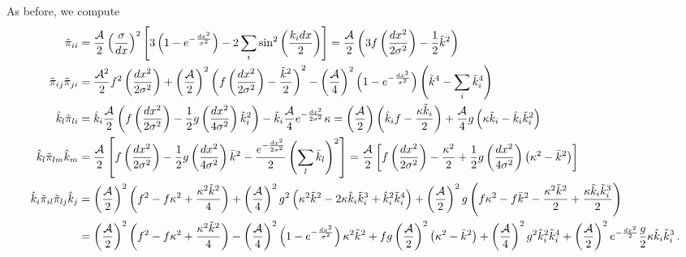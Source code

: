 \documentclass{revtex4}
\begin{document}
As before, we compute
\begin{subequations}
  \begin{align}
    \tilde{\pi}_{ii} &= \frac{\mathcal{A}}{2}\left(\frac{\sigma}{dx}\right)^2 \left[3\left(1-e^{-\frac{dx^2}{\sigma^2}}\right) - 2\sum_i\sin^2\left(\frac{k_idx}{2}\right)\right] = \frac{\mathcal{A}}{2}\left(3f\left(\frac{dx^2}{2\sigma^2}\right) - \frac{1}{2}\tilde{k}^2\right) \\
    \tilde{\pi}_{ij}\tilde{\pi}_{ji} &= \frac{\mathcal{A}^2}{2}f^2\left(\frac{dx^2}{2\sigma^2}\right) + \left(\frac{\mathcal{A}}{2}\right)^2\left(f\left(\frac{dx^2}{2\sigma^2}\right)-\frac{\tilde{k}^2}{2}\right)^2 - \left(\frac{\mathcal{A}}{4}\right)^2\left(1-e^{-\frac{dx^2}{\sigma^2}}\right)\left(\tilde{k}^4 - \sum_i\tilde{k}_i^4\right) \\
    \hat{k}_l\tilde{\pi}_{li} &= \hat{k}_i\frac{\mathcal{A}}{2}\left(f\left(\frac{dx^2}{2\sigma^2}\right)-\frac{1}{2}g\left(\frac{dx^2}{4\sigma^2}\right)\tilde{k}_i^2\right) - \tilde{k}_i\frac{\mathcal{A}}{4}e^{-\frac{dx^2}{2\sigma^2}}\kappa = \left(\frac{\mathcal{A}}{2}\right)\left(\hat{k}_if - \frac{\kappa\tilde{k}_i}{2}\right) + \frac{\mathcal{A}}{4}g\left(\kappa\tilde{k}_i-\hat{k}_i\tilde{k}_i^2\right) \\
    \hat{k}_l\tilde{\pi}_{lm}\hat{k}_m &= \frac{\mathcal{A}}{2}\left[f\left(\frac{dx^2}{2\sigma^2}\right) - \frac{1}{2}g\left(\frac{dx^2}{4\sigma^2}\right)\bar{k}^2 - \frac{e^{-\frac{dx^2}{2\sigma^2}}}{2}\left(\sum_l\bar{k}_l\right)^2 \right]  = \frac{\mathcal{A}}{2}\left[f\left(\frac{dx^2}{2\sigma^2}\right) - \frac{\kappa^2}{2} + \frac{1}{2}g\left(\frac{dx^2}{4\sigma^2}\right)\left(\kappa^2 - \bar{k}^2\right) \right] \\
    \hat{k}_i\tilde{\pi}_{il}\tilde{\pi}_{lj}\hat{k}_j &= \left(\frac{\mathcal{A}}{2}\right)^2\left(f^2 - f\kappa^2 + \frac{\kappa^2\tilde{k}^2}{4}\right) + \left(\frac{\mathcal{A}}{4}\right)^2g^2\left(\kappa^2\tilde{k}^2 - 2\kappa\hat{k}_i\tilde{k}_i^3 + \hat{k}_i^2\tilde{k}_i^4 \right) + \left(\frac{\mathcal{A}}{2}\right)^2g\left(f\kappa^2 - f\bar{k}^2 - \frac{\kappa^2\tilde{k}^2}{2} + \frac{\kappa\hat{k}_i\tilde{k}_i^3}{2} \right) \notag \\
    &= \left(\frac{\mathcal{A}}{2}\right)^2\left(f^2 - f\kappa^2 + \frac{\kappa^2\tilde{k}^2}{4}\right) - \left(\frac{\mathcal{A}}{4}\right)^2\left(1-e^{-\frac{dx^2}{\sigma^2}}\right)\kappa^2\tilde{k}^2 + fg\left(\frac{\mathcal{A}}{2}\right)^2\left(\kappa^2-\bar{k}^2\right) + \left(\frac{\mathcal{A}}{4}\right)^2g^2\hat{k}_i^2\tilde{k}_i^4 + \left(\frac{\mathcal{A}}{2}\right)^2e^{-\frac{dx^2}{2}}\frac{g}{2}\kappa\hat{k}_i\tilde{k}_i^3  \, .
  \end{align}
\end{subequations}
\end{document}
